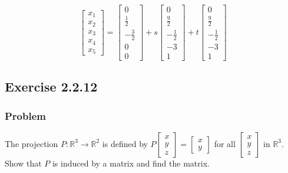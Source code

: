 \documentclass[12pt]{article}
\begin{document}
\begin{equation*}
  \begin{bmatrix}
    x_1\\ 
    x_2\\ 
    x_3\\ 
    x_4\\ 
    x_5 
  \end{bmatrix} =
  \begin{bmatrix}
    0\\ 
    \frac{1}{2}\\ 
    -\frac{3}{2}\\ 
    0\\ 
    0 
  \end{bmatrix}
  + s 
  \begin{bmatrix}
    0\\ 
    \frac{9}{2}\\ 
    -\frac{1}{2}\\ 
    -3\\ 
    1 
  \end{bmatrix}
  + t 
  \begin{bmatrix}
    0\\ 
    \frac{9}{2}\\ 
    -\frac{1}{2}\\ 
    -3\\ 
    1 
  \end{bmatrix}
\end{equation*}
\vspace{2in}
\subsection{Exercise 2.2.12}
\vspace{0.25in}
\subsubsection*{Problem}
The projection $P : \mathbb{R}^3 \rightarrow \mathbb{R}^2$ is defined by $P\begin{bmatrix}
  x\\ 
  y\\ 
  z 
\end{bmatrix} 
= 
\begin{bmatrix}
  x\\ 
  y 
\end{bmatrix}
$ 
for all
$\begin{bmatrix}
  x\\ 
  y\\ 
  z 
\end{bmatrix}
$ 
in $\mathbb{R}^3$. Show that $P$ is induced by a matrix and find the matrix. 
\end{document}
